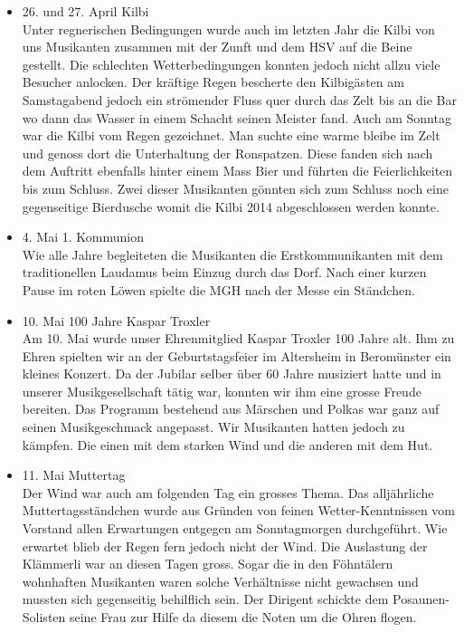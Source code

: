 \begin{history}
\begin{itemize}
        \item 26. und 27. April Kilbi\\
              Unter regnerischen Bedingungen wurde auch im letzten Jahr die Kilbi von
              uns Musikanten zusammen mit der Zunft und dem HSV auf die Beine
              gestellt. Die schlechten Wetterbedingungen konnten jedoch nicht allzu
              viele Besucher anlocken.  Der kräftige Regen bescherte den Kilbigästen
              am Samstagabend jedoch ein strömender Fluss quer durch das Zelt bis an
              die Bar  wo dann das Wasser in einem Schacht seinen Meister fand. Auch
              am Sonntag war die Kilbi vom Regen gezeichnet. Man suchte eine warme
              bleibe im Zelt und genoss dort die Unterhaltung der Ronspatzen. Diese
              fanden sich nach dem Auftritt ebenfalls hinter einem Mass Bier  und
              führten die Feierlichkeiten bis zum Schluss. Zwei dieser Musikanten
              gönnten sich zum Schluss noch eine gegenseitige Bierdusche womit die
              Kilbi 2014 abgeschlossen werden konnte.

        \item 4. Mai 1. Kommunion\\
              Wie alle Jahre begleiteten die Musikanten die Erstkommunikanten mit dem
              traditionellen Laudamus beim Einzug durch das Dorf. Nach einer kurzen
              Pause im roten Löwen spielte die MGH nach der Messe ein Ständchen.

        \item 10. Mai 100 Jahre Kaspar Troxler\\
              Am 10. Mai wurde unser Ehrenmitglied Kaspar Troxler 100 Jahre alt. Ihm
              zu Ehren spielten wir an der Geburtstagsfeier im Altersheim in
              Beromünster ein kleines Konzert. Da der Jubilar selber über 60 Jahre
              musiziert hatte und in unserer Musikgesellschaft tätig war, konnten wir
              ihm eine grosse Freude bereiten. Das Programm bestehend aus Märschen und
              Polkas war ganz auf seinen Musikgeschmack angepasst. Wir Musikanten
              hatten jedoch zu kämpfen. Die einen mit dem starken Wind und die anderen
              mit dem Hut.

        \item 11. Mai Muttertag\\
              Der Wind war auch am folgenden Tag ein grosses Thema. Das alljährliche
              Muttertagsständchen wurde aus Gründen von feinen Wetter-Kenntnissen vom
              Vorstand allen Erwartungen entgegen am Sonntagmorgen durchgeführt. Wie
              erwartet blieb der Regen fern jedoch nicht der Wind. Die Auslastung der
              Klämmerli war an diesen Tagen gross. Sogar die in den Föhntälern
              wohnhaften Musikanten waren solche Verhältnisse nicht gewachsen und
              mussten sich gegenseitig behilflich sein. Der Dirigent schickte dem
              Posaunen-Solisten seine Frau zur Hilfe da diesem die Noten um die Ohren
              flogen.


\end{itemize}
\end{history}
